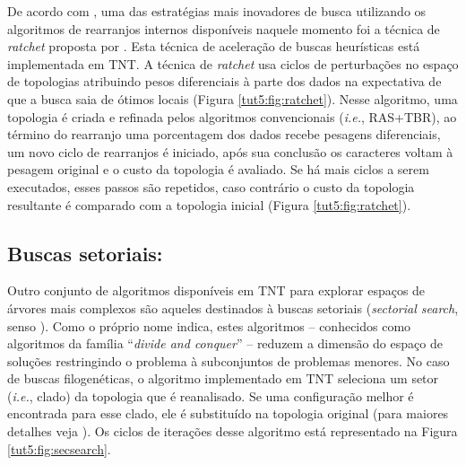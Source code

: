 \begin{refsection}
De acordo com \textcite{Giribet_2007}, uma das estratégias mais inovadores de busca utilizando os algoritmos de rearranjos internos disponíveis naquele momento foi a técnica de \textit{ratchet} proposta por \textcite{Nixon_1999}. Esta técnica de aceleração de buscas heurísticas está implementada em TNT. A técnica de \textit{ratchet} usa ciclos de perturbações no espaço de topologias atribuindo pesos diferenciais à parte dos dados na expectativa de que a busca saia de ótimos locais (Figura \ref{tut5:fig:ratchet}). Nesse algoritmo, uma topologia é criada e refinada pelos algoritmos convencionais (\textit{i.e.}, RAS+TBR), ao término do rearranjo uma porcentagem dos dados recebe pesagens diferenciais, um novo ciclo de rearranjos é iniciado, após sua conclusão os caracteres voltam à pesagem original e o custo da topologia é avaliado. Se há mais ciclos a serem executados, esses passos são repetidos, caso contrário o custo da topologia resultante é comparado com a topologia inicial (Figura \ref{tut5:fig:ratchet}).

\subsection{Buscas setoriais:}

Outro conjunto de algoritmos disponíveis em TNT para explorar espaços de árvores mais complexos são aqueles destinados à buscas setoriais (\textit{sectorial search}, senso \textcite{Goloboff_1999}). Como o próprio nome indica, estes algoritmos -- conhecidos como algoritmos da família ``\textit{divide and conquer}'' -- reduzem a dimensão do espaço de soluções restringindo o problema à subconjuntos de problemas menores. No caso de buscas filogenéticas, o algoritmo implementado em TNT seleciona um setor (\textit{i.e.}, clado) da topologia que é reanalisado. Se uma configuração melhor é encontrada para esse clado, ele é substituído na topologia original (para maiores detalhes veja \textcite{Goloboff_1999, Wheeler_2012}). Os ciclos de iterações desse algoritmo está representado na Figura \ref{tut5:fig:secsearch}.



\end{refsection}
